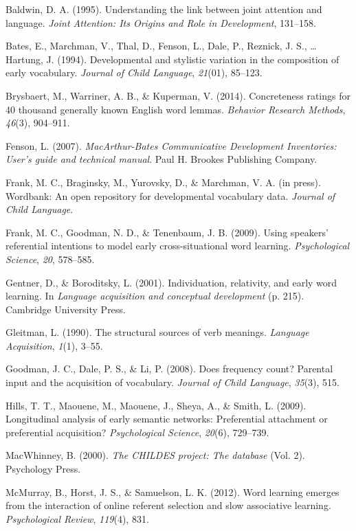 \documentclass[10pt, letterpaper]{article}
\begin{document}
\setlength{\parindent}{-0.1in} \setlength{\leftskip}{0.125in} \noindent

Baldwin, D. A. (1995). Understanding the link between joint attention
and language. \emph{Joint Attention: Its Origins and Role in
Development}, 131--158.

Bates, E., Marchman, V., Thal, D., Fenson, L., Dale, P., Reznick, J. S.,
\ldots{} Hartung, J. (1994). Developmental and stylistic variation in
the composition of early vocabulary. \emph{Journal of Child Language},
\emph{21}(01), 85--123.

Brysbaert, M., Warriner, A. B., \& Kuperman, V. (2014). Concreteness
ratings for 40 thousand generally known English word lemmas.
\emph{Behavior Research Methods}, \emph{46}(3), 904--911.

Fenson, L. (2007). \emph{MacArthur-Bates Communicative Development
Inventories: User's guide and technical manual}. Paul H. Brookes
Publishing Company.

Frank, M. C., Braginsky, M., Yurovsky, D., \& Marchman, V. A. (in
press). Wordbank: An open repository for developmental vocabulary data.
\emph{Journal of Child Language}.

Frank, M. C., Goodman, N. D., \& Tenenbaum, J. B. (2009). Using
speakers' referential intentions to model early cross-situational word
learning. \emph{Psychological Science}, \emph{20}, 578--585.

Gentner, D., \& Boroditsky, L. (2001). Individuation, relativity, and
early word learning. In \emph{Language acquisition and conceptual
development} (p. 215). Cambridge University Press.

Gleitman, L. (1990). The structural sources of verb meanings.
\emph{Language Acquisition}, \emph{1}(1), 3--55.

Goodman, J. C., Dale, P. S., \& Li, P. (2008). Does frequency count?
Parental input and the acquisition of vocabulary. \emph{Journal of Child
Language}, \emph{35}(3), 515.

Hills, T. T., Maouene, M., Maouene, J., Sheya, A., \& Smith, L. (2009).
Longitudinal analysis of early semantic networks: Preferential
attachment or preferential acquisition? \emph{Psychological Science},
\emph{20}(6), 729--739.

MacWhinney, B. (2000). \emph{The CHILDES project: The database} (Vol.
2). Psychology Press.

McMurray, B., Horst, J. S., \& Samuelson, L. K. (2012). Word learning
emerges from the interaction of online referent selection and slow
associative learning. \emph{Psychological Review}, \emph{119}(4), 831.
\end{document}
